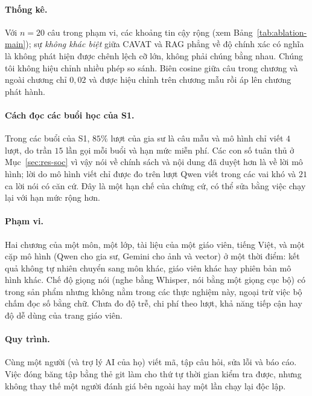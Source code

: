 \paragraph{Thống kê.}
Với $n=20$ câu trong phạm vi, các khoảng tin cậy rộng (xem Bảng~\ref{tab:ablation-main}); sự \emph{không khác biệt} giữa CAVAT và RAG phẳng về độ chính xác có nghĩa là không phát hiện được chênh lệch cỡ lớn, không phải chúng bằng nhau. Chúng tôi không hiệu chỉnh nhiều phép so sánh. Biên cosine giữa câu trong chương và ngoài chương chỉ $0{,}02$ và được hiệu chỉnh trên chương mẫu rồi áp lên chương phát hành.

\paragraph{Cách đọc các buổi học của S1.}
Trong các buổi của S1, $85\%$ lượt của gia sư là câu mẫu và mô hình chỉ viết $4$ lượt, do trần $15$ lần gọi mỗi buổi và hạn mức miễn phí. Các con số tuân thủ ở Mục~\ref{sec:res-soc} vì vậy nói về chính sách và nội dung đã duyệt hơn là về lời mô hình; lời do mô hình viết chỉ được đo trên \CavTurnsLLM{} lượt Qwen viết trong các vai khó và $21$ ca lời nói có căn cứ. Đây là một hạn chế của chứng cứ, có thể sửa bằng việc chạy lại với hạn mức rộng hơn.

\paragraph{Phạm vi.}
Hai chương của một môn, một lớp, tài liệu của một giáo viên, tiếng Việt, và một cặp mô hình (Qwen cho gia sư, Gemini cho ảnh và vector) ở một thời điểm: kết quả không tự nhiên chuyển sang môn khác, giáo viên khác hay phiên bản mô hình khác. Chế độ giọng nói (nghe bằng Whisper, nói bằng một giọng cục bộ) có trong sản phẩm nhưng không nằm trong các thực nghiệm này, ngoại trừ việc bộ chấm đọc số bằng chữ. Chưa đo độ trễ, chi phí theo lượt, khả năng tiếp cận hay độ dễ dùng của trang giáo viên.

\paragraph{Quy trình.}
Cùng một người (và trợ lý AI của họ) viết mã, tập câu hỏi, sửa lỗi và báo cáo. Việc đóng băng tập bằng thẻ git làm cho thứ tự thời gian kiểm tra được, nhưng không thay thế một người đánh giá bên ngoài hay một lần chạy lại độc lập.
